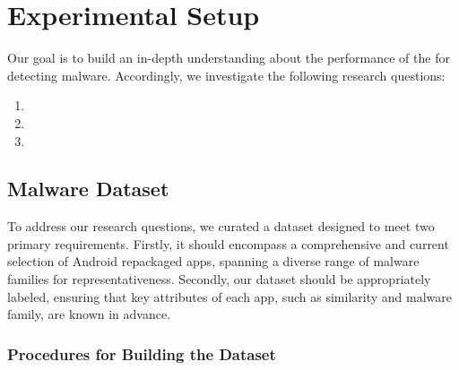 \section{Experimental Setup}\label{sec:experimentalSetup}

Our goal is to build an in-depth understanding about
the performance of the \mas for detecting malware.  Accordingly,
we investigate the following research questions:

\begin{enumerate}[(RQ1)]
\item \rqa
\item \rqc
\item \rqd
\end{enumerate}



\subsection{Malware Dataset}\label{sec:dataset}


To address our research questions, we curated a dataset designed to meet two primary requirements.
Firstly, it should encompass a comprehensive and current selection of Android repackaged apps, spanning a diverse range of malware families for representativeness.
Secondly, our dataset should be appropriately labeled, ensuring that key attributes of each app, such as similarity and malware family, are known in advance.

\subsubsection{Procedures for Building the Dataset}

